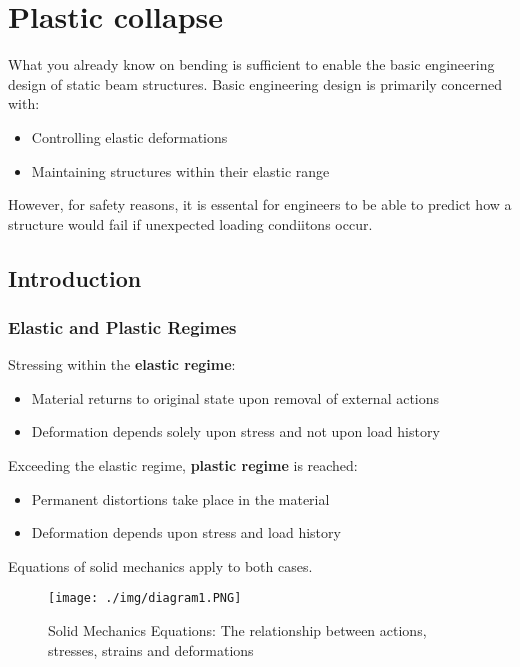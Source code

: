 \chapter{Plastic collapse}
What you already know on bending is sufficient to enable the basic engineering design of static beam structures. Basic engineering design is primarily concerned with:
\begin{itemize}
  \item Controlling elastic deformations
  \item Maintaining structures within their elastic range
\end{itemize}
However, for safety reasons, it is essental for engineers to be able to predict how a structure would fail if unexpected loading condiitons occur.
\section{Introduction}
\subsection{Elastic and Plastic Regimes}
Stressing within the \textbf{elastic regime}:
\begin{itemize}
  \item Material returns to original state upon removal of external actions
  \item Deformation depends solely upon stress and not upon load history
\end{itemize}
Exceeding the elastic regime, \textbf{plastic regime} is reached:
\begin{itemize}
  \item Permanent distortions take place in the material
  \item Deformation depends upon stress and load history
\end{itemize}
Equations of solid mechanics apply to both cases.
\begin{figure}[H]
  \centering
  \texttt{[image: ./img/diagram1.PNG]}
  \caption{Solid Mechanics Equations: The relationship between actions, stresses, strains and deformations}
\end{figure}
